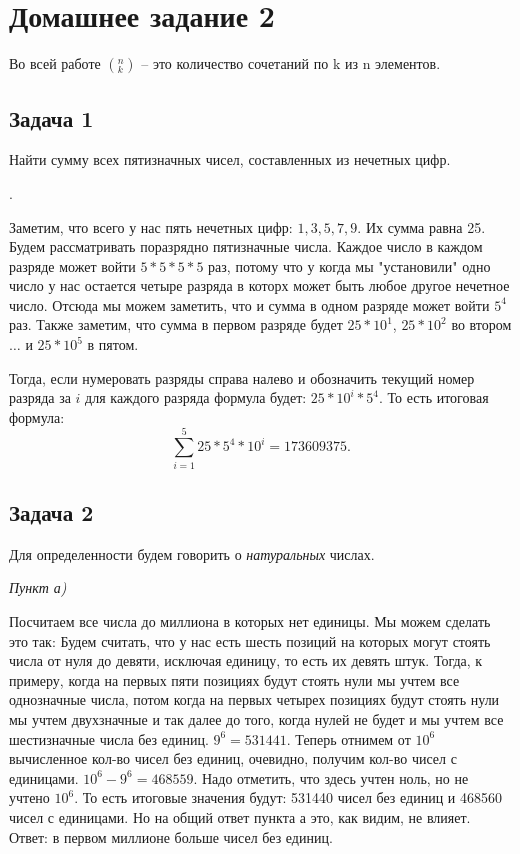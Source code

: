 

	\section{Домашнее задание 2}
	Во всей работе $\left(_{k}^{n}\right)$ -- это количество сочетаний по k из n элементов. 
	\subsection{Задача 1}
	Найти сумму всех пятизначных чисел, составленных из нечетных цифр.
	
	{.}
	
	Заметим, что всего у нас пять нечетных цифр: $1, 3, 5, 7, 9$.	
	Их сумма равна 25.
	Будем рассматривать поразрядно пятизначные числа. Каждое число в каждом разряде может войти $ 5*5*5*5$ раз, потому что у когда мы "установили" одно число у нас остается четыре разряда в которх может быть любое другое нечетное число. Отсюда мы можем заметить, что и сумма в одном разряде может войти $5^4$ раз. 
	Также заметим, что сумма в первом разряде будет $25 * 10^1$, $25 * 10^2$ во втором $\dots$ и $25 * 10^5$ в пятом.
	
	Тогда, если нумеровать разряды справа налево и обозначить текущий номер разряда за $i$ для каждого разряда формула будет: $25*10^i*5^4$.
	То есть итоговая формула: 
	\[
		\sum_{i = 1}^{5} 25*5^4*10^i = 173609375.
	\]
	\subsection{Задача 2}
	Для определенности будем говорить о \textit{натуральных} числах.
	
	\textit{Пункт а)}	
	
	Посчитаем все числа до миллиона в которых нет единицы. Мы можем сделать это так:
	Будем считать, что у нас есть шесть позиций на которых могут стоять числа от нуля до девяти, исключая единицу, то есть их девять штук. Тогда, к примеру, когда на первых пяти позициях будут стоять нули мы учтем все однозначные числа, потом когда на первых четырех позициях будут стоять нули мы учтем двухзначные и так далее до того, когда нулей не будет и мы учтем все шестизначные числа без единиц.
	$9^6 = 531441$.
	Теперь отнимем от $10^6$ вычисленное кол-во чисел без единиц, очевидно, получим кол-во чисел с единицами.
	$10^6 - 9^6 = 468559$.
	Надо отметить, что здесь учтен ноль, но не учтено $10^6$. То есть итоговые значения будут: 531440 чисел без единиц и 468560 чисел с единицами. Но на общий ответ пункта а это, как видим, не влияет. 
	Ответ: в первом миллионе больше чисел без единиц.
	

